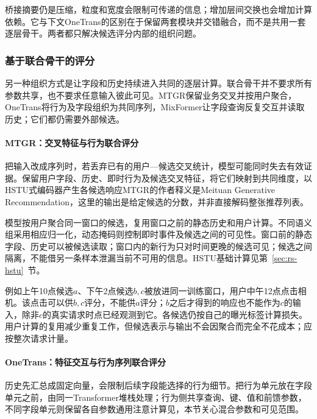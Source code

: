 桥接摘要仍是压缩，粒度和宽度会限制可传递的信息；增加层间交换也会增加计算依赖。它与下文OneTrans的区别在于保留两套模块并交错融合，而不是共用一套逐层骨干。两者都只解决候选评分内部的组织问题。

\subsubsection{基于联合骨干的评分}
\label{sec:rs-joint-backbone}

另一种组织方式是让字段和历史持续进入共同的逐层计算。联合骨干并不要求所有参数共享，也不要求任意输入彼此可见。MTGR保留业务交叉并按用户聚合，OneTrans将行为及字段组织为共同序列，MixFormer让字段查询反复交互并读取历史；它们都仍需要外部候选。

\Needspace{110mm}
\paragraph{MTGR：交叉特征与行为联合评分}
\label{sec:rs-mtgr}

把输入改成序列时，若丢弃已有的用户—候选交叉统计，模型可能同时失去有效证据。保留用户字段、历史、即时行为及候选交叉特征，将它们映射到共同维度，以HSTU式编码器产生各候选响应MTGR的作者释义是Meituan Generative Recommendation，这里的输出是给定候选的分数，并非直接解码整张推荐列表。

模型按用户聚合同一窗口的候选，复用窗口之前的静态历史和用户计算。不同语义组采用相应归一化，动态掩码则控制即时事件及候选之间的可见性。窗口前的静态字段、历史可以被候选读取；窗口内的新行为只对时间更晚的候选可见；候选之间隔离，不能借另一条样本泄漏当前不可用的信息。HSTU基础计算见第~\ref{sec:rs-hstu}~节。

例如上午10点候选$a$、下午2点候选$b,c$被放进同一训练窗口，用户中午12点点击相机。该点击可以供$b,c$评分，不能供$a$评分；$b$之后才得到的响应也不能作为$c$的输入，除非$c$的真实请求时点已经观测到它。各候选仍按自己的曝光标签计算损失。用户计算的复用减少重复工作，但候选表示与输出不会因聚合而完全不花成本；应按整次请求计量。

\paragraph{OneTrans：特征交互与行为序列联合评分}
\label{sec:rs-onetrans}

历史先汇总成固定向量，会限制后续字段能选择的行为细节。把行为单元放在字段单元之前，由同一Transformer堆栈处理；行为侧共享查询、键、值和前馈参数，不同字段单元则保留各自参数通用注意计算见，本节关心混合参数和可见范围。

